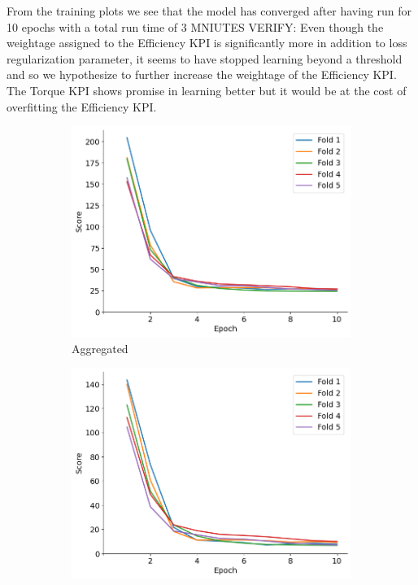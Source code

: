 \documentclass{report} %
\begin{document}
From the training plots we see that the model has converged after having run for 10 epochs with a total run time of 3 MNIUTES VERIFY:
Even though the weightage assigned to the Efficiency \ac{KPI} is significantly more in addition to loss regularization parameter, it seems to have stopped learning 
beyond a threshold and so we hypothesize to further increase the weightage of the Efficiency \ac{KPI}.
The Torque \ac{KPI} shows promise in learning better but it would be at the cost of overfitting the Efficiency \ac{KPI}.
\begin{figure}[H]
    \centering
    \begin{subfigure}{0.32\textwidth}
        \centering
        \includegraphics[width=\textwidth]{./ReportImages/val_score.png}
        \caption{\centering Aggregated}
        \label{fig:Aggregated Validation Score}
    \end{subfigure}\hfill
    \begin{subfigure}{0.32\textwidth}
        \centering
        \includegraphics[width=\textwidth]{./ReportImages/val_score_y1.png}

\end{subfigure}
\end{figure}
\end{document}
